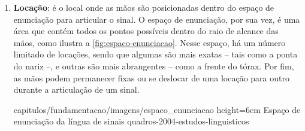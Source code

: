 \begin{enumerate}

    \item \textbf{Locação}: é o local onde as mãos são posicionadas dentro do espaço de enunciação para articular o sinal. O espaço de enunciação, por sua vez, é uma área que contém todos os pontos possíveis dentro do raio de alcance das mãos, como ilustra a \autoref{fig:espaco-enunciacao}. Nesse espaço, há um número limitado de locações, sendo que algumas são mais exatas -- tais como a ponta do nariz --, e outras são mais abrangentes -- como a frente do tórax. Por fim, as mãos podem permanecer fixas ou se deslocar de uma locação para outro durante a articulação de um sinal.
    
        {capitulos/fundamentacao/imagens/espaco_enunciacao} %
        {height=6cm} %
        {Espaço de enunciação da língua de sinais} %
        {quadros-2004-estudos-linguisticos} %







\end{enumerate}
